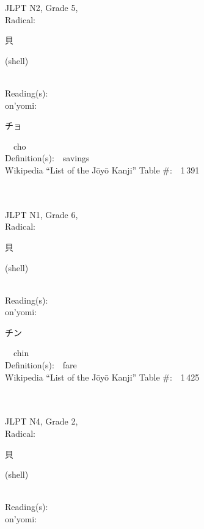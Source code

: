 \begin{multicols}{2}
{JLPT N2, Grade 5, \\Radical:\ \ {\begin{CJK}{UTF8}{min} 貝 \end{CJK}} (shell) } \\
Reading(s):\ \ \\
{\hspace*{1em}}on'yomi:\ \ \\
{\hspace*{2em}}{\begin{CJK}{UTF8}{min} チョ \end{CJK}}\ \ cho\ \ \\
Definition(s):\ \ savings \\
Wikipedia ``List of the J\=oy\=o Kanji'' Table \#:\ \ 1\,391 \\
\ \ \\
{\fontsize{34pt}{40pt}  }\ \ \\  %
{JLPT N1, Grade 6, \\Radical:\ \ {\begin{CJK}{UTF8}{min} 貝 \end{CJK}} (shell) } \\
Reading(s):\ \ \\
{\hspace*{1em}}on'yomi:\ \ \\
{\hspace*{2em}}{\begin{CJK}{UTF8}{min} チン \end{CJK}}\ \ chin\ \ \\
Definition(s):\ \ fare \\
Wikipedia ``List of the J\=oy\=o Kanji'' Table \#:\ \ 1\,425 \\
\ \ \\
{\fontsize{34pt}{40pt}  }\ \ \\  %
{JLPT N4, Grade 2, \\Radical:\ \ {\begin{CJK}{UTF8}{min} 貝 \end{CJK}} (shell) } \\
Reading(s):\ \ \\
{\hspace*{1em}}on'yomi:\ \ \\

\end{multicols}
